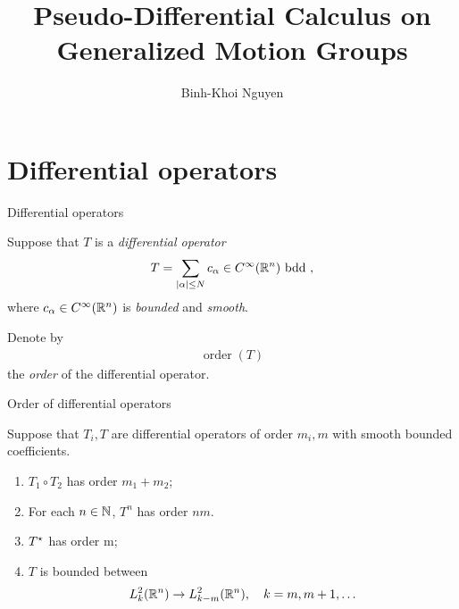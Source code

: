 \documentclass{beamer}
\title{Pseudo-Differential Calculus on Generalized Motion Groups}
\author{Binh-Khoi Nguyen}
\DeclareMathOperator{\order}{order}
\begin{document}
\maketitle

\section{Differential operators}

\renewcommand \Group {\R^n}

\begin{frame}
    {Differential operators}

    Suppose that $T$ is a \emph{differential operator}
    \begin{align*}
        T =
        \sum_{\left|{\alpha}\right| \leq N}
        c_\alpha \in {C^\infty(\mathbb{R}^n)}
        \text{ bdd },
    \end{align*}
    where $c_\alpha \in {C^\infty(\mathbb{R}^n)}$ is \emph{bounded} and \emph{smooth}.

    \pause

    Denote by
    \begin{align*}
        \order(T)
    \end{align*}
    the \emph{order} of the differential operator.
\end{frame}

\begin{frame}
    {Order of differential operators}

    Suppose that $T_i, T$ are differential operators
    of order $m_i, m$
    with smooth bounded coefficients.

    \begin{enumerate}
        \item $T_1 \circ T_2$ has order $m_1 + m_2$;
            \pause
        \item For each $n \in \mathbb{N}$, $T^n$ has order $n m$.
            \pause
        \item ${T}^\star$ has order m;
            \pause
        \item $T$ is bounded between
            \begin{align*}
                \Sobolev k \to \Sobolev {k - m},
                \quad k = m, m + 1, \dots
            \end{align*}
    \end{enumerate}
\end{frame}
\end{document}
